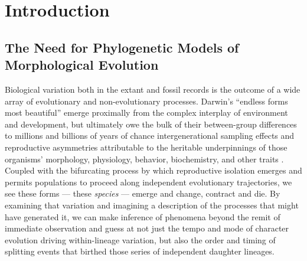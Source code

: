 \chapter{Introduction}

\label{chpt:Chapter1}




\clearpage


\section{The Need for Phylogenetic Models of Morphological Evolution}

Biological variation both in the extant and fossil records is the outcome of a wide array of evolutionary and non-evolutionary processes. Darwin's ``endless forms most beautiful'' \citep{darwinOriginSpeciesMeans1859} emerge proximally from the complex interplay of environment and development, but ultimately owe the bulk of their between-group differences to millions and billions of years of chance intergenerational sampling effects and reproductive asymmetries attributable to the heritable underpinnings of those organisms' morphology, physiology, behavior, biochemistry, and other traits \citep{mayrNewPhilosophyBiology1988}. Coupled with the bifurcating process by which reproductive isolation emerges and permits populations to proceed along independent evolutionary trajectories, we see these forms --- these \textit{species} --- emerge and change, contract and die. By examining that variation and imagining a description of the processes that might have generated it, we can make inference of phenomena beyond the remit of immediate observation and guess at not just the tempo and mode of character evolution driving within-lineage variation, but also the order and timing of splitting events that birthed those series of independent daughter lineages. 

